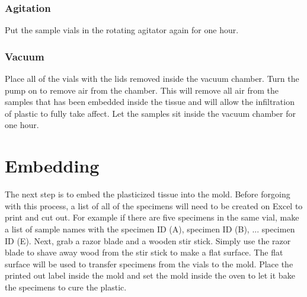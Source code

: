 \subsubsection{Agitation}
Put the sample vials in the rotating agitator again for one hour.

\subsubsection{Vacuum}
Place all of the vials with the lids removed inside the vacuum chamber.  Turn
the pump on to remove air from the chamber.  This will remove all air from the
samples that has been embedded inside the tissue and will allow the
infiltration of plastic to fully take affect.  Let the samples sit inside the
vacuum chamber for one hour.

\section{Embedding}
The next step is to embed the plasticized tissue into the mold.  Before
forgoing with this process, a list of all of the specimens will need to be
created on Excel to print and cut out.  For example if there are five specimens
in the same vial, make a list of sample names with the specimen ID (A),
specimen ID (B), ... specimen ID (E).  Next, grab a razor blade and a wooden
stir stick.  Simply use the razor blade to shave away wood from the stir stick
to make a flat surface.  The flat surface will be used to transfer specimens
from the vials to the mold.  Place the printed out label inside the mold and
set the mold inside the oven to let it bake the specimens to cure the plastic.  
